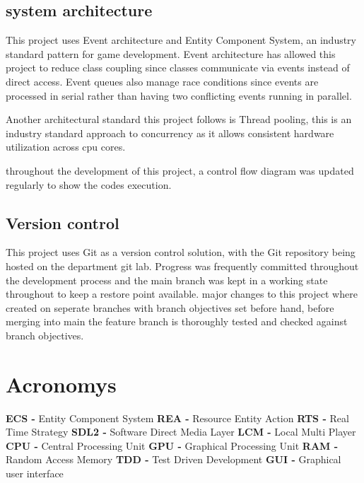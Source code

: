 \documentclass[]{final_report}
\begin{document}
\section{system architecture}
This project uses Event architecture and Entity Component System, an industry standard pattern for game development. Event architecture has allowed this project to reduce class coupling since classes communicate via events instead of direct access. Event queues also manage race conditions since events are processed in serial rather than having two conflicting events running in parallel. 

Another architectural standard this project follows is Thread pooling, this is an industry standard approach to concurrency as it allows consistent hardware utilization across cpu cores. 

throughout the development of this project, a control flow diagram was updated regularly to show the codes execution.

\section{Version control}
This project uses Git as a version control solution, with the Git repository being hosted on the department git lab. Progress was frequently committed throughout the development process and the main branch was kept in a working state throughout to keep a restore point available. major changes to this project where created on seperate branches with branch objectives set before hand, before merging into main the feature branch is thoroughly tested and checked against branch objectives.
\newpage
\chapter{Acronomys}
\textbf{ECS - }Entity Component System \newline
\textbf{REA - }Resource Entity Action \newline
\textbf{RTS - }Real Time Strategy \newline
\textbf{SDL2 - }Software Direct Media Layer \newline
\textbf{LCM - }Local Multi Player \newline
\textbf{CPU - }Central Processing Unit \newline
\textbf{GPU - }Graphical Processing Unit \newline
\textbf{RAM - }Random Access Memory \newline
\textbf{TDD - }Test Driven Development \newline
\textbf{GUI - }Graphical user interface \newline
\newpage
\end{document}
